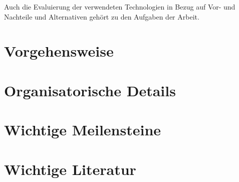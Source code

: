 \documentclass[master,german]{hgbthesis}
\begin{document}
Auch die Evaluierung der verwendeten Technologien in Bezug auf Vor- und Nachteile und Alternativen gehört zu den Aufgaben der Arbeit.

\section{Vorgehensweise}

\section{Organisatorische Details}

\section{Wichtige Meilensteine}

\section{Wichtige Literatur}


\MakeBibliography                     				%
%

\end{document}
